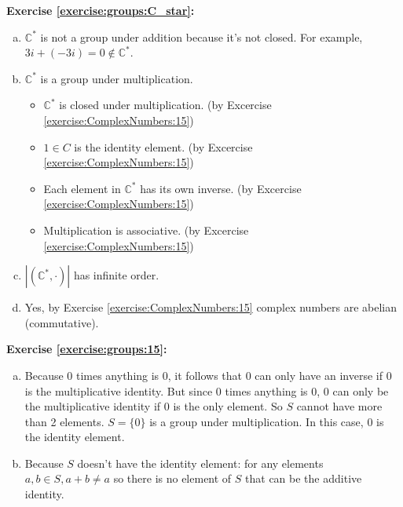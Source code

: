 \noindent\textbf{Exercise \ref{exercise:groups:C_star}:}
\begin{enumerate}[(a)]
\item
${\mathbb C}^{\ast}$ is not a group under addition because it's not closed. For example, 
$3i + (-3i) = 0 \not\in {\mathbb C}^{\ast}$.

\item
${\mathbb C}^{\ast}$ is a group under multiplication.
	
	\begin{itemize}
	\item
	${\mathbb C}^{\ast}$ is closed under multiplication. \quad \quad (by Excercise \ref{exercise:ComplexNumbers:15})

	\item
	$1 \in C$ is the identity element. \quad \quad (by Excercise \ref{exercise:ComplexNumbers:15})

	\item
	Each element in ${\mathbb C}^{\ast}$ has its own inverse. \quad \quad (by Excercise \ref{exercise:ComplexNumbers:15})

	\item
	Multiplication is associative. \quad \quad (by Excercise \ref{exercise:ComplexNumbers:15})
	\end{itemize}
	
\item
$|({\mathbb C}^{\ast}, \cdot)|$ has infinite order.

\item
Yes, by Exercise \ref{exercise:ComplexNumbers:15} complex numbers are abelian (commutative).
\end{enumerate} 

\noindent\textbf{Exercise \ref{exercise:groups:15}:}
\begin{enumerate}[(a)]
\item
Because 0 times anything is 0, it follows that 0 can only have an inverse if 0 is the multiplicative identity. But since 0 times anything is 0, 0 can only be the multiplicative identity if 0 is the only element. So $S$ cannot have more than 2 elements.
 $S = \{0\}$ is a group under multiplication. In this case, $0$ is the identity element.

\item
Because $S$ doesn't have the identity element: for any elements $a,b \in S, a+b \neq a$ so there is no element of $S$ that can be the additive identity.
\end{enumerate}

